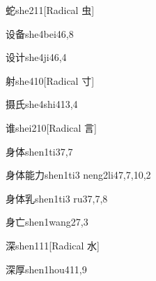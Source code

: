\begin{verbete}{蛇}{she2}{11}[Radical 虫]
\end{verbete}

\begin{verbete}{设备}{she4bei4}{6,8}
\end{verbete}

\begin{verbete}{设计}{she4ji4}{6,4}
\end{verbete}

\begin{verbete}{射}{she4}{10}[Radical 寸]
\end{verbete}

\begin{verbete}{摄氏}{she4shi4}{13,4}
\end{verbete}

\begin{verbete}{谁}{shei2}{10}[Radical 言]
\end{verbete}

\begin{verbete}{身体}{shen1ti3}{7,7}
\end{verbete}

\begin{verbete}{身体能力}{shen1ti3 neng2li4}{7,7,10,2}
\end{verbete}

\begin{verbete}{身体乳}{shen1ti3 ru3}{7,7,8}
\end{verbete}

\begin{verbete}{身亡}{shen1wang2}{7,3}
\end{verbete}

\begin{verbete}{深}{shen1}{11}[Radical 水]
\end{verbete}

\begin{verbete}{深厚}{shen1hou4}{11,9}
\end{verbete}

